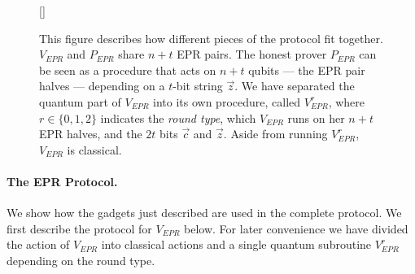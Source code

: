 \documentclass[11pt]{article}
\theoremstyle{remark}
\theoremstyle{definition}
\begin{document}
\begin{figure}[h]
[\FBwidth]
{}
{\caption{This figure describes how different pieces of the protocol fit together. $V_{EPR}$ and $P_{EPR}$ share $n+t$ EPR pairs. The honest prover $P_{EPR}$ can be seen as a procedure that acts on $n+t$ qubits --- the EPR pair halves --- depending on a $t$-bit string $\vec{z}$.  We have separated the quantum part of $V_{EPR}$ into its own procedure, called $V_{EPR}^{r}$, where $r\in\{0,1,2\}$ indicates the \emph{round type}, which $V_{EPR}$ runs on her $n+t$ EPR halves, and the $2t$ bits $\vec{c}$ and $\vec{z}$. Aside from running $V_{EPR}^r$, $V_{EPR}$ is classical. }\label{fig:EPR-high-level}}
\end{figure}



\paragraph{The EPR Protocol.} We show how the gadgets just described are used in the complete protocol. We first describe the protocol for $V_{EPR}$ below.  For later convenience we have divided the action of $V_{EPR}$ into classical actions and a single quantum subroutine $V_{EPR}^r$ depending on the round type. 
\end{document}
